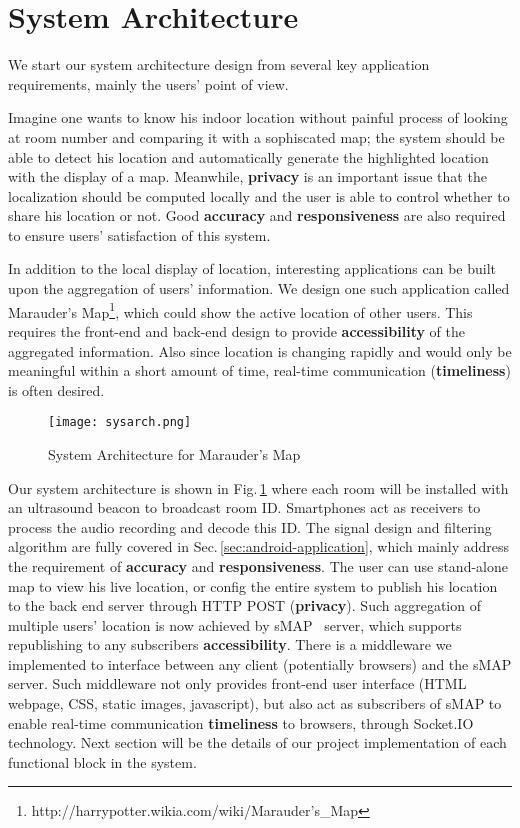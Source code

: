 \section{System Architecture}
\label{sec:system-architecture}
We start our system architecture design from several key application requirements, mainly the users' point of view.

Imagine one wants to know his indoor location without painful process of looking at room number and comparing it with a sophiscated map; the system should be able to detect his location and automatically generate the highlighted location with the display of a map. Meanwhile, {\bf privacy} is an important issue that the localization should be computed locally and the user is able to control whether to share his location or not. Good {\bf accuracy} and {\bf responsiveness} are also required to ensure users' satisfaction of this system.  

In addition to the local display of location, interesting applications can be built upon the aggregation of users' information. We design one such application called Marauder's Map\footnote{http://harrypotter.wikia.com/wiki/Marauder's\_Map}, which could show the active location of other users. This requires the front-end and back-end design to provide {\bf accessibility} of the aggregated information. Also since location is changing rapidly and would only be meaningful within a short amount of time, real-time communication ({\bf timeliness}) is often desired.

\begin{figure}
  \centering
  \texttt{[image: sysarch.png]}
  \caption{System Architecture for Marauder's Map}
  \label{fig:sysarch}
\end{figure}

Our system architecture is shown in Fig.\,\ref{fig:sysarch} where each room will be installed with an ultrasound beacon to broadcast room ID. Smartphones act as receivers to process the audio recording and decode this ID. The signal design and filtering algorithm are fully covered in Sec.\,\ref{sec:android-application}, which mainly address the requirement of {\bf accuracy} and {\bf responsiveness}. The user can use stand-alone map to view his live location, or config the entire system to publish his location to the back end server through HTTP POST ({\bf privacy}). Such aggregation of multiple users' location is now achieved by sMAP~\cite{dawson2010smap} server, which supports republishing to any subscribers {\bf accessibility}. There is a middleware we implemented to interface between any client (potentially browsers) and the sMAP server. Such middleware not only provides front-end user interface (HTML webpage, CSS, static images, javascript), but also act as subscribers of sMAP to enable real-time communication {\bf timeliness} to browsers, through Socket.IO~\cite{socketio} technology. Next section will be the details of our project implementation of each functional block in the system.

